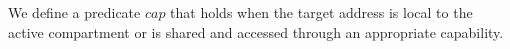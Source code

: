 \documentclass{llncs}
\begin{document}
We define a predicate \(\mathit{cap}\) that holds when the target address is local to the active
compartment or is shared and accessed through an appropriate capability.

%





\end{document}
